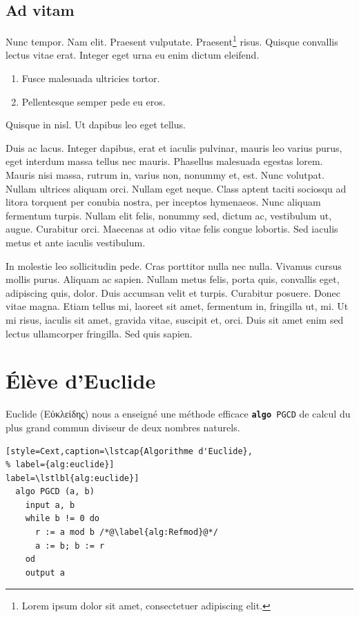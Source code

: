\documentclass[a4paper,twoside,10pt,english,french]{article}   %
\newcommand{\mymarginpar}[1]{%
  \marginpar[\raggedleft\footnotesize#1]{\raggedright\footnotesize#1}
}
\newcommand{\lstlbl}[1]{#1} %
\newcommand{\lstcap}[1]{#1} %
\newcommand{\cpp}{\mymarginpar{\fbox{\large\ttfamily C++}}}
\theoremstyle{definition}
\theoremstyle{remark}
\theoremstyle{plain}
\begin{document}
\subsection{Ad vitam}

Nunc tempor. Nam elit. Praesent vulputate. Praesent\footnote{Lorem ipsum dolor sit amet, consectetuer adipiscing elit.} risus. Quisque convallis lectus vitae erat. Integer eget urna eu enim dictum eleifend. 
\begin{enumerate}
  \item Fusce malesuada ultricies tortor.
  \item Pellentesque semper pede eu eros.
\end{enumerate}
Quisque in nisl. Ut dapibus leo eget tellus.

Duis ac lacus. Integer dapibus, erat et iaculis pulvinar, mauris leo varius purus, eget interdum massa tellus nec mauris. Phasellus malesuada egestas lorem. \mymarginpar{Nunc est bibendum} Mauris nisi massa, rutrum in, varius non, nonummy et, est. Nunc volutpat. Nullam ultrices aliquam orci. Nullam eget neque. Class aptent taciti sociosqu ad litora torquent per conubia nostra, per inceptos hymenaeos. Nunc aliquam fermentum turpis. Nullam elit felis, nonummy sed, dictum ac, vestibulum ut, augue. Curabitur orci. Maecenas at odio vitae felis congue lobortis. Sed iaculis metus et ante iaculis vestibulum.

In molestie leo sollicitudin pede. Cras porttitor nulla nec nulla. Vivamus cursus mollis purus. Aliquam ac sapien. Nullam metus felis, porta quis, convallis eget, adipiscing quis, dolor. Duis accumsan velit et turpis. Curabitur posuere. Donec vitae magna. Etiam tellus mi, laoreet sit amet, fermentum in, fringilla ut, mi. Ut mi risus, iaculis sit amet, gravida vitae, suscipit et, orci. Duis sit amet enim sed lectus ullamcorper fringilla. Sed quis sapien.

\section{Élève d'Euclide}

Euclide (Εὐκλείδης) nous a enseigné une méthode efficace \texttt{\textbf{algo} PGCD} de calcul du plus grand commun diviseur de deux nombres naturels.\cpp
\begin{lstlisting}[style=Cext,caption=\lstcap{Algorithme d'Euclide},
% label={alg:euclide}]
label=\lstlbl{alg:euclide}]
  algo PGCD (a, b)
    input a, b
    while b != 0 do
      r := a mod b /*@\label{alg:Refmod}@*/
      a := b; b := r
    od
    output a
\end{lstlisting}
\end{document}
